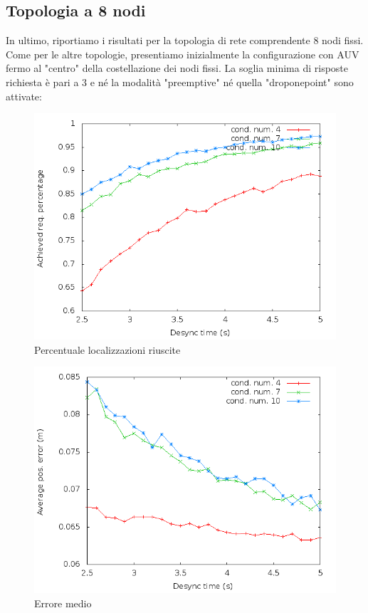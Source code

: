 \documentclass[Lau,binding=0.6cm]{sapthesis}
\begin{document}
\subsection{Topologia a 8 nodi}
In ultimo, riportiamo i risultati per la topologia di rete comprendente 8 nodi fissi. 
Come per le altre topologie, presentiamo inizialmente la configurazione con AUV fermo al "centro" della costellazione dei nodi fissi. La soglia minima di risposte richiesta è pari a 3 e né la modalità "preemptive" né quella "droponepoint" sono attivate:
\begin{figure}[H]
    \centering
    \includegraphics[scale=0.5]{octagonsimulation/achievedlocreq3preempt0drop0speed0.png}
    \caption{Percentuale localizzazioni riuscite}
    \label{fig:octagonsimulation/achievedlocreq3preempt0drop0speed0}
\end{figure}
\begin{figure}[H]
    \centering
    \includegraphics[scale=0.5]{octagonsimulation/avposerrorreq3preempt0drop0speed0.png}
    \caption{Errore medio}
    \label{fig:octagonsimulation/avposerrorreq3preempt0drop0speed0}
\end{figure}
\end{document}
